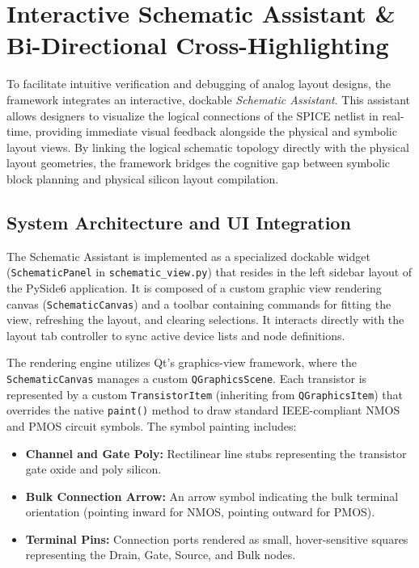 \section[Interactive Schematic Assistant]{Interactive Schematic Assistant \& Bi-Directional Cross-Highlighting}
\label{sec:schematic_assistant}

\noindent
To facilitate intuitive verification and debugging of analog layout designs, the framework integrates an interactive, dockable \emph{Schematic Assistant}. This assistant allows designers to visualize the logical connections of the SPICE netlist in real-time, providing immediate visual feedback alongside the physical and symbolic layout views. By linking the logical schematic topology directly with the physical layout geometries, the framework bridges the cognitive gap between symbolic block planning and physical silicon layout compilation.

\subsection{System Architecture and UI Integration}
\noindent
The Schematic Assistant is implemented as a specialized dockable widget (\texttt{SchematicPanel} in \texttt{schematic\_view.py}) that resides in the left sidebar layout of the PySide6 application. It is composed of a custom graphic view rendering canvas (\texttt{Schematic}\allowbreak\texttt{Canvas}) and a toolbar containing commands for fitting the view, refreshing the layout, and clearing selections. It interacts directly with the layout tab controller to sync active device lists and node definitions.

\noindent
The rendering engine utilizes Qt's graphics-view framework, where the \texttt{Schematic}\allowbreak\texttt{Canvas} manages a custom \texttt{QGraphicsScene}. Each transistor is represented by a custom \texttt{TransistorItem} (inheriting from \texttt{QGraphicsItem}) that overrides the native \texttt{paint()} method to draw standard IEEE-compliant NMOS and PMOS circuit symbols. The symbol painting includes:
\begin{itemize}
    \item \textbf{Channel and Gate Poly:} Rectilinear line stubs representing the transistor gate oxide and poly silicon.
    \item \textbf{Bulk Connection Arrow:} An arrow symbol indicating the bulk terminal orientation (pointing inward for NMOS, pointing outward for PMOS).
    \item \textbf{Terminal Pins:} Connection ports rendered as small, hover-sensitive squares representing the Drain, Gate, Source, and Bulk nodes.
\end{itemize}

